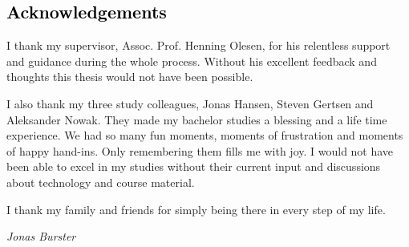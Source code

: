 {\textcolor{black}{\section*{\textcolor{black}{Acknowledgements}}}}
\noindent I thank my supervisor, Assoc. Prof. Henning Olesen, for his relentless support and guidance during the whole process.
Without his excellent feedback and thoughts this thesis would not have been possible.

\hspace{1.5cm}

\noindent I also thank my three study colleagues, Jonas Hansen, Steven Gertsen and Aleksander Nowak. They made my bachelor studies a blessing and a life time experience. We had so many fun moments, moments of frustration and moments of happy hand-ins. Only remembering them fills me with joy. I would not have been able to excel in my studies without their current input and discussions about technology and course material. 

\hspace{1.5cm}

\noindent I thank my family and friends for simply being there in every step of my life.

\hspace{1.5cm}

\noindent \textit{Jonas Burster}